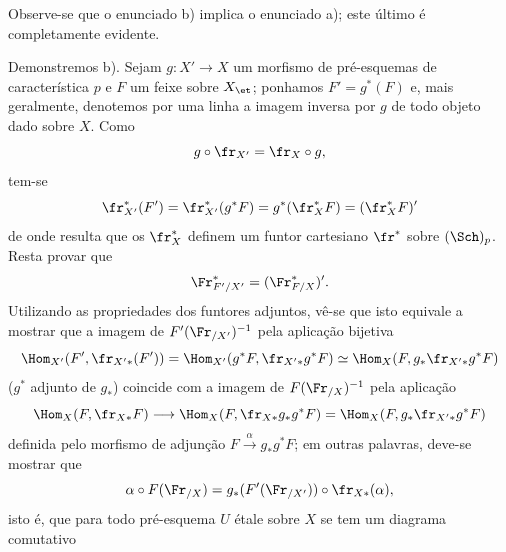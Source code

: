 Observe-se que o enunciado b) implica o enunciado a); este último é completamente evidente.

Demonstremos b). Sejam $g:X'\to X$ um morfismo de pré-esquemas de característica $p$ e $F$ um feixe sobre $X_{\et}$; ponhamos $F'=g^*(F)$ e, mais geralmente, denotemos por uma linha a imagem inversa por $g$ de todo objeto dado sobre $X$. Como
\[
g\circ\fr_{X'}=\fr_X\circ g,
\]
tem-se
\[
\fr_{X'}^*(F')=\fr_{X'}^*(g^*F)=g^*(\fr_X^*F)=(\fr_X^*F)'
\]
de onde resulta que os $\fr_X^*$ definem um funtor cartesiano $\fr^*$ sobre $(\Sch)_p$. Resta provar que
\[
\Fr^*_{F'/X'}=(\Fr^*_{F/X})'.
\]
Utilizando as propriedades dos funtores adjuntos, vê-se que isto equivale a mostrar que a imagem de $F'(\Fr_{/X'})^{-1}$ pela aplicação bijetiva
\[
\Hom_{X'}(F',\fr_{X'*}(F'))
 =\Hom_{X'}(g^*F,\fr_{X'*}g^*F)
 \simeq \Hom_X(F,g_*\fr_{X'*}g^*F)
\]
($g^*$ adjunto de $g_*$) coincide com a imagem de $F(\Fr_{/X})^{-1}$ pela aplicação
\[
\Hom_X(F,\fr_{X*}F)\longrightarrow
\Hom_X(F,\fr_{X*}g_*g^*F)=
\Hom_X(F,g_*\fr_{X'*}g^*F)
\]
definida pelo morfismo de adjunção $F\xrightarrow{\alpha} g_*g^*F$; em outras palavras, deve-se mostrar que
\[
\alpha\circ F(\Fr_{/X})=g_*(F'(\Fr_{/X'}))\circ\fr_{X*}(\alpha),
\]
isto é, que para todo pré-esquema $U$ étale sobre $X$ se tem um diagrama comutativo
